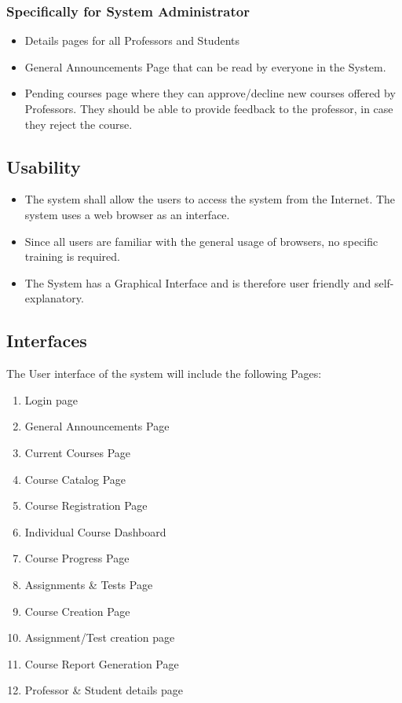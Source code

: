 \documentclass[12pt, a4]{article}
\begin{document}
\subsubsection{Specifically for System Administrator}
\begin{itemize}
    \item Details pages for all Professors and Students
    \item General Announcements Page that can be read by everyone in the System.
    \item Pending courses page where they can approve/decline new courses offered by Professors. They should be able to provide feedback to the professor, in case they reject the course.
\end{itemize}


\subsection{Usability}
\begin{itemize}
    \item The system shall allow the users to access the system from the Internet. The system uses a web browser as an interface.
    \item Since all users are familiar with the general usage of browsers, no specific training is required.
    \item The System has a Graphical Interface and is therefore user friendly and self-explanatory.
\end{itemize}


\subsection{Interfaces}
The User interface of the system will include the following Pages:
\begin{enumerate}
    \item Login page
    \item General Announcements Page
    \item Current Courses Page
    \item Course Catalog Page
    \item Course Registration Page
    \item Individual Course Dashboard
    \item Course Progress Page
    \item Assignments \& Tests Page
    \item Course Creation Page
    \item Assignment/Test creation page
    \item Course Report Generation Page
    \item Professor \& Student details page
\end{enumerate}
\end{document}
